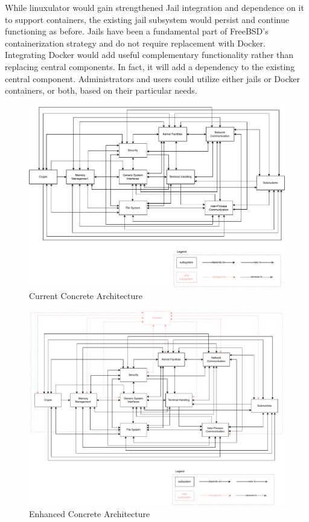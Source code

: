 \documentclass[12pt, dvipsnames, a4paper]{article}
\begin{document}
While linuxulator would gain strengthened Jail integration and dependence on it to support containers, the existing jail subsystem would persist and continue functioning as before. Jails have been a fundamental part of FreeBSD's containerization strategy and do not require replacement with Docker. Integrating Docker would add useful complementary functionality rather than replacing central components. In fact, it will add a dependency to the existing central component. Administrators and users could utilize either jails or Docker containers, or both, based on their particular needs.

\begin{figure}[!htb]
	\center
	\includegraphics[width = 450pt]{assets/architecture_diagrams/current-concrete-architecture.pdf}
	\caption{Current Concrete Architecture}
\end{figure}

\begin{figure}[!htb]
	\center
	\includegraphics[width = 450pt]{assets/architecture_diagrams/enhanced-concrete-architecture.pdf}
	\caption{Enhanced Concrete Architecture}
\end{figure}
\end{document}

